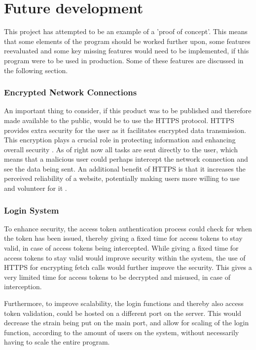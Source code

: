 \section{Future development} \label{sec:futuredev}
This project has attempted to be an example of a 'proof of concept'. This means that some elements of the program should be worked further upon, some features reevaluated and some key missing features would need to be implemented, if this program were to be used in production. Some of these features are discussed in the following section.


\subsubsection{Encrypted Network Connections}
An important thing to consider, if this product was to be published and therefore made available to the public, would be to use the HTTPS protocol. HTTPS provides extra security for the user as it facilitates encrypted data transmission. This encryption plays a crucial role in protecting information and enhancing overall security \cite{HTTPSadvantage}. As of right now all tasks are sent directly to the user, which means that a malicious user could perhaps intercept the network connection and see the data being sent. An additional benefit of HTTPS is that it increases the perceived reliability of a website, potentially making users more willing to use and volunteer for it \cite{HTTPSadvantage}.

\subsubsection{Login System}

To enhance security, the access token authentication process could check for when the token has been issued, thereby giving a fixed time for access tokens to stay valid, in case of access tokens being intercepted.
While giving a fixed time for access tokens to stay valid would improve security within the system, the use of HTTPS for encrypting fetch calls would further improve the security. This gives a very limited time for access tokens to be decrypted and misused, in case of interception. 

Furthermore, to improve scalability, the login functions and thereby also access token validation, could be hosted on a different port on the server. This would decrease the strain being put on the main port, and allow for scaling of the login function, according to the amount of users on the system, without necessarily having to scale the entire program.

